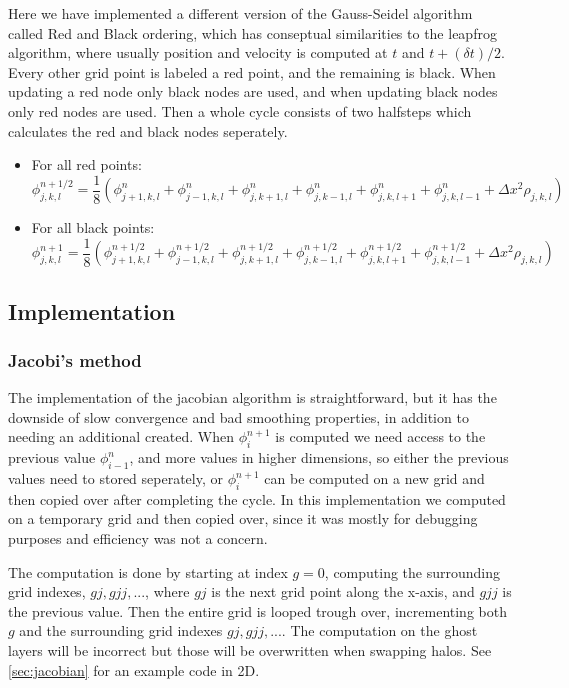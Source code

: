 	Here we have implemented a different version of the Gauss-Seidel algorithm called Red and Black ordering, which has conseptual similarities
	to the leapfrog algorithm, where usually position and velocity is computed at \(t\) and \( t+(\delta t)/2 \). Every other grid point is labeled a
	red point, and the remaining is black. When updating a red node only black nodes are used, and when updating black nodes only
	red nodes are used. Then a whole cycle consists of two halfsteps which calculates the red and black nodes seperately.

	\begin{itemize}
		\item For all red points:
			\[\phi^{n+1/2}_{j,k,l} = \frac{1}{8} \left( \phi^n_{j+1,k,l} +\phi^{n}_{j-1,k,l} + \phi^n_{j,k+1,l} + \phi^{n}_{j,k-1,l} +
	 							\phi^n_{j,k,l+1} + \phi^{n}_{j,k,l-1} + \Delta x^2 \rho_{j,k,l} \right)
			\]
		\item For all black points:
		\[\phi^{n+1}_{j,k,l} = \frac{1}{8} \left( \phi^{n+1/2}_{j+1,k,l} +\phi^{n+1/2}_{j-1,k,l} + \phi^{n+1/2}_{j,k+1,l} + \phi^{n+1/2}_{j,k-1,l} +
							\phi^{n+1/2}_{j,k,l+1} + \phi^{n+1/2}_{j,k,l-1} + \Delta x^2 \rho_{j,k,l} \right)
		\]
	\end{itemize}



	\subsection{Implementation}
		\subsubsection{Jacobi's method}
		The implementation of the jacobian algorithm is straightforward, but it has the downside of slow convergence and
		bad smoothing properties, in addition to needing an additional created. When \(\phi^{n+1}_{i}\) is computed
		we need access to the previous value \(\phi^n_{i-1}\), and more values in higher dimensions, so either the previous values
		need to stored seperately, or \(\phi^{n+1}_{i}\) can be computed on a new grid and then copied over after completing the cycle.
		In this implementation we computed on a temporary grid and then copied over, since it was mostly for debugging purposes and
		efficiency was not a concern.

		The computation is done by starting at index \(g=0\), computing the surrounding grid indexes, \(gj, gjj,...\), where \(gj\)
		is the next grid point along the x-axis, and \(gjj\) is the previous value. Then the entire grid is looped trough over, incrementing
		both \(g\) and the surrounding grid indexes \(gj, gjj,...\). The computation on the ghost layers will be incorrect but those will be overwritten
		when swapping halos. See \ref{sec:jacobian} for an example code in 2D.

